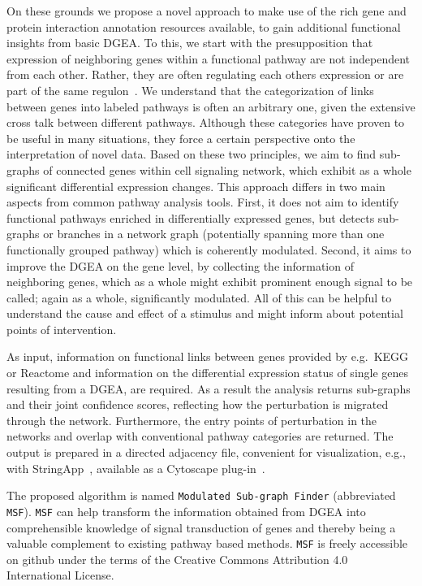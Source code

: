 \documentclass[10pt,a4paper,twocolumn]{article}
\begin{document}
	On these grounds we propose a novel approach to make use of the rich gene
	and protein interaction annotation resources available, to gain additional
	functional insights from basic DGEA. To this, we start with the
	presupposition that expression of neighboring genes within a functional
	pathway are not independent from each other. Rather, they are often
	regulating each others expression or are part of the same
	regulon~\cite{Michalak}. We understand that the categorization of links
	between genes into labeled pathways is often an arbitrary one, given the
	extensive cross talk between different pathways. Although these categories
	have proven to be useful in many situations, they force a certain
	perspective onto the interpretation of novel data. Based on these two
	principles, we aim to find sub-graphs of connected genes within cell
	signaling network, which exhibit as a whole significant differential
	expression changes. This approach differs in two main aspects from common
	pathway analysis tools. First, it does not aim to identify functional
	pathways enriched in differentially expressed genes, but detects sub-graphs
	or branches in a network graph (potentially spanning more than one
	functionally grouped pathway) which is coherently modulated. Second, it
	aims to improve the DGEA on the gene level, by collecting the information
	of neighboring genes, which as a whole might exhibit prominent enough
	signal to be called; again as a whole, significantly modulated. All of this can be helpful to understand the cause and effect of a stimulus and might inform about potential points of intervention.
	
	As input, information on functional links between genes provided by
	e.g.~KEGG or Reactome and information on the differential expression status
	of single genes resulting from a DGEA, are required. As a result the
	analysis returns sub-graphs and their joint confidence scores, reflecting
	how the perturbation is migrated through the network. Furthermore, the
	entry points of perturbation in the networks and overlap with conventional
	pathway categories are returned. The output is prepared in a directed
	adjacency file, convenient for visualization, e.g., with
	StringApp~\cite{StringApp}, available as a Cytoscape plug-in~\cite{Cyto}.
	
	The proposed algorithm is named
	\texttt{Modulated Sub-graph Finder} (abbreviated
	\texttt{MSF}). \texttt{MSF} can help transform the information obtained
	from DGEA into comprehensible knowledge of signal transduction of genes and
	thereby being a valuable complement to existing pathway based
	methods.  \texttt{MSF} is freely accessible on github under the terms of the
	Creative Commons Attribution 4.0 International License.
	
\end{document}
